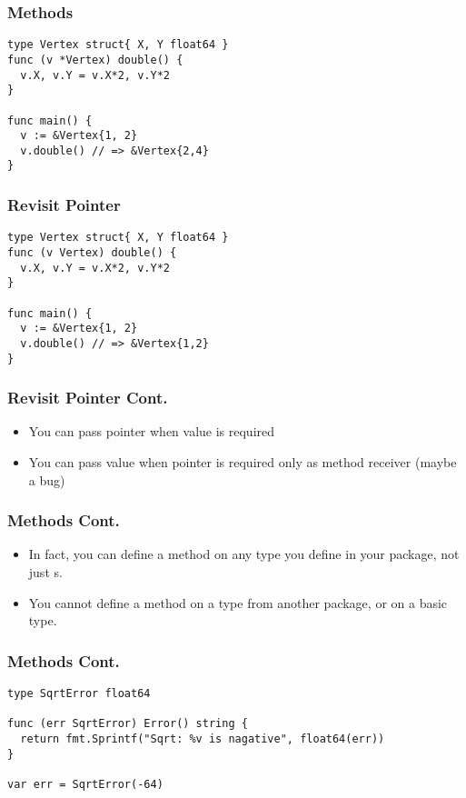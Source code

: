 \documentclass[xetex,mathserif,serif,12pt]{beamer}
\begin{document}
\begin{frame}[fragile]
  \frametitle{Methods}

  \begin{beamer@nomargin}
    \begin{lstlisting}
type Vertex struct{ X, Y float64 }
func (v *Vertex) double() {
  v.X, v.Y = v.X*2, v.Y*2
}

func main() {
  v := &Vertex{1, 2}
  v.double() // => &Vertex{2,4}
}
    \end{lstlisting}
  \end{beamer@nomargin}
\end{frame}

\begin{frame}[fragile]
  \frametitle{Revisit Pointer}

  \begin{beamer@nomargin}
    \begin{lstlisting}
type Vertex struct{ X, Y float64 }
func (v Vertex) double() {
  v.X, v.Y = v.X*2, v.Y*2
}

func main() {
  v := &Vertex{1, 2}
  v.double() // => &Vertex{1,2}
}
    \end{lstlisting}
  \end{beamer@nomargin}
\end{frame}

\begin{frame}
  \frametitle{Revisit Pointer Cont.}

  \begin{itemize}
  \item You can pass pointer when value is required
  \item You can pass value when pointer is required only as method receiver (maybe a bug)
  \end{itemize}
\end{frame}

\begin{frame}
  \frametitle{Methods Cont.}

  \begin{itemize}
  \item In fact, you can define a method on any type you define in your package, not just s.
  \item You cannot define a method on a type from another package, or on a basic type.
  \end{itemize}
\end{frame}

\begin{frame}[fragile]
  \frametitle{Methods Cont.}

  \begin{beamer@nomargin}
    \begin{lstlisting}
type SqrtError float64

func (err SqrtError) Error() string {
  return fmt.Sprintf("Sqrt: %v is nagative", float64(err))
}

var err = SqrtError(-64)
    \end{lstlisting}
  \end{beamer@nomargin}
\end{frame}
\end{document}

